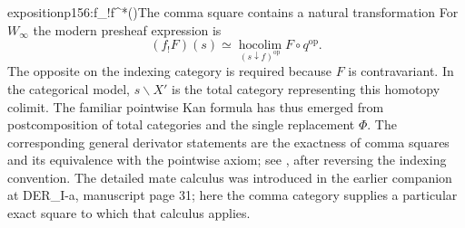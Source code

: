 \begin{dcomment}{exposition}{p156:f_!f^*(\xi)\simeq\hot}{The comma square contains a natural transformation}
For $W_\infty$ the modern presheaf expression is
\[
 (f_!F)(s)\simeq
 \operatorname*{hocolim}_{(s\downarrow f)^{\mathrm{op}}}F\circ q^{\mathrm{op}}.
\]
The opposite on the indexing category is required because $F$ is contravariant. In the categorical model, $s\backslash X'$ is the total category representing this homotopy colimit. The familiar pointwise Kan formula has thus emerged from postcomposition of total categories and the single replacement $\Phi$. The corresponding general derivator statements are the exactness of comma squares and its equivalence with the pointwise axiom; see \citet[Proposition~1.26]{Groth2013}, after reversing the indexing convention. The detailed mate calculus was introduced in the earlier companion at DER\_I-a, manuscript page 31; here the comma category supplies a particular exact square to which that calculus applies.
\end{dcomment}

